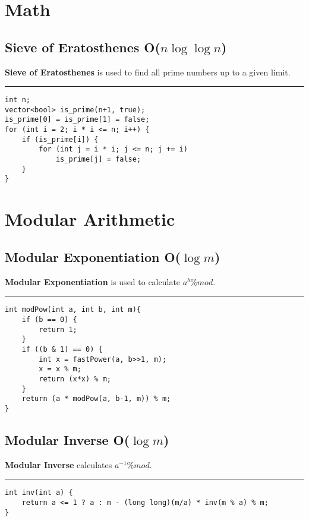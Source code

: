\documentclass{article}
\begin{document}
\pagebreak

\section{Math}

\subsection{Sieve of Eratosthenes O($n \log \log n$)}

\textbf{Sieve of Eratosthenes} is used to find all prime numbers up to a given limit.

\noindent\rule{\textwidth}{1pt}

\begin{verbatim}
int n;
vector<bool> is_prime(n+1, true);
is_prime[0] = is_prime[1] = false;
for (int i = 2; i * i <= n; i++) {
    if (is_prime[i]) {
        for (int j = i * i; j <= n; j += i)
            is_prime[j] = false;
    }
}
\end{verbatim}

\section{Modular Arithmetic}

\subsection{Modular Exponentiation O($\log m$)}

\textbf{Modular Exponentiation} is used to calculate $a^b \% mod$.

\noindent\rule{\textwidth}{1pt}

\begin{verbatim}
int modPow(int a, int b, int m){
    if (b == 0) {
        return 1;
    }
    if ((b & 1) == 0) {
        int x = fastPower(a, b>>1, m);
        x = x % m;
        return (x*x) % m;
    }
    return (a * modPow(a, b-1, m)) % m;
}
\end{verbatim}

\subsection{Modular Inverse O($\log m$)}

\textbf{Modular Inverse} calculates $a^{-1} \% mod$.

\noindent\rule{\textwidth}{1pt}

\begin{verbatim}
int inv(int a) {
    return a <= 1 ? a : m - (long long)(m/a) * inv(m % a) % m;
}
\end{verbatim}
\end{document}
